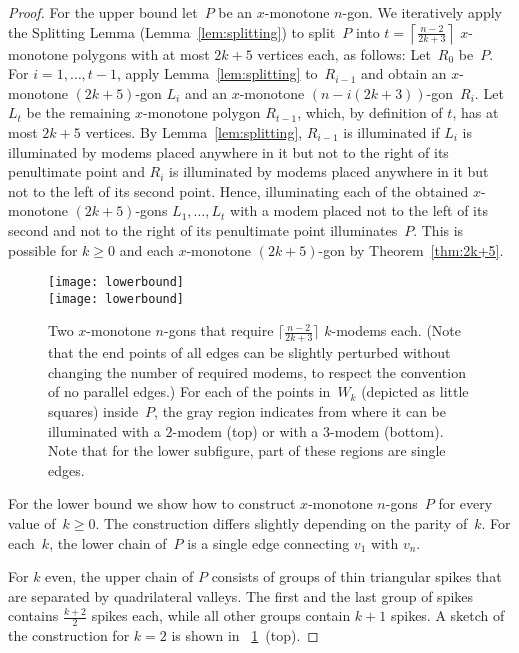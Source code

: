 \documentclass[A4]{article}
\begin{document}
\begin{proof}
For the upper bound let~$P$ be an $x$-monotone $n$-gon.
We iteratively apply the Splitting Lemma (Lemma~\ref{lem:splitting}) to split~$P$ into $t=\left\lceil \frac{n-2}{2k+3} \right\rceil$ $x$-monotone polygons with at most \mbox{$2k\!+\!5$} vertices each, as follows: 
Let~$R_0$ be~$P$.
For $i = 1,\ldots,t-1$, apply Lemma~\ref{lem:splitting} to~$R_{i-1}$ and obtain an $x$-monotone \mbox{$(2k\!+\!5)$-gon} $L_i$ and an $x$-monotone \mbox{$(n\!-\!i(2k\!+\!3))$-gon}~$R_i$.
Let~$L_t$ be the remaining $x$-monotone polygon $R_{t-1}$, which, by definition of $t$, has at most $2k+5$ vertices.
By Lemma~\ref{lem:splitting}, $R_{i-1}$ is illuminated if $L_i$ is illuminated by modems placed anywhere in it but not to the right of its penultimate point and $R_i$ is illuminated by modems placed anywhere in it but not to the left of its second point.
Hence, illuminating each of the obtained $x$-monotone $(2k+5)$-gons $L_1,\ldots,L_t$ with a modem placed not to the left of its second and not to the right of its penultimate point illuminates~$P$.
This is possible for $k\geq 0$ and each $x$-monotone $(2k+5)$-gon by Theorem~\ref{thm:2k+5}.


\begin{figure}[htb]
  \centering
  \texttt{[image: lowerbound]} \\
  \vspace{3mm}
  \texttt{[image: lowerbound]} \\
  \caption{Two $x$-monotone $n$-gons that require $\lceil\frac{n-2}{2k+3}\rceil$ \mbox{$k$-modems} each. 
    (Note that the end points of all edges can be slightly perturbed without changing the number of required modems, to respect the convention of no parallel edges.)
    For each of the points in~$W_k$ (depicted as little squares) inside~$P$, the gray region indicates from where it can be illuminated with a \mbox{$2$-modem} (top) or with a \mbox{$3$-modem} (bottom).
    Note that for the lower subfigure, part of these regions are single edges.  }
\label{fig:lower}
\end{figure}


For the lower bound we show how to construct $x$-monotone $n$-gons~$P$ for every value of~$k\geq 0$. 
The construction differs slightly depending on the parity of~$k$.
For each~$k$, the lower chain of~$P$ is a single edge connecting $v_1$ with $v_n$.

For $k$ even, the upper chain of $P$ consists of groups of thin triangular spikes that are separated by quadrilateral valleys. 
The first and the last group of spikes contains $\frac{k+2}{2}$ spikes each, while all other groups contain $k+1$ spikes. 
A sketch of the construction for $k=2$ is shown in \figurename~\ref{fig:lower}~(top).



\end{proof}
\end{document}

